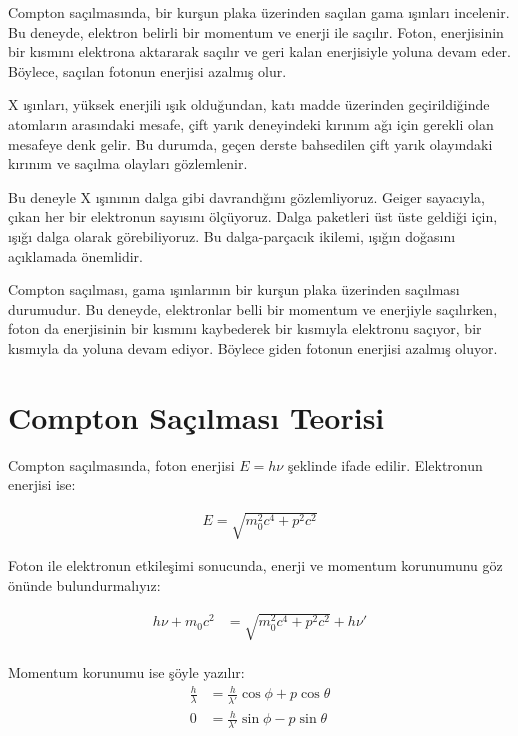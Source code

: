 \documentclass[11pt,letterpaper]{fenbil}
\begin{document}
Compton saçılmasında, bir kurşun plaka üzerinden saçılan gama ışınları incelenir. Bu deneyde, elektron belirli bir momentum ve enerji ile saçılır. Foton, enerjisinin bir kısmını elektrona aktararak saçılır ve geri kalan enerjisiyle yoluna devam eder. Böylece, saçılan fotonun enerjisi azalmış olur.

X ışınları, yüksek enerjili ışık olduğundan, katı madde üzerinden geçirildiğinde atomların arasındaki mesafe, çift yarık deneyindeki kırınım ağı için gerekli olan mesafeye denk gelir. Bu durumda, geçen derste bahsedilen çift yarık olayındaki kırınım ve saçılma olayları gözlemlenir.

Bu deneyle X ışınının dalga gibi davrandığını gözlemliyoruz. Geiger sayacıyla, çıkan her bir elektronun sayısını ölçüyoruz. Dalga paketleri üst üste geldiği için, ışığı dalga olarak görebiliyoruz. Bu dalga-parçacık ikilemi, ışığın doğasını açıklamada önemlidir.

\begin{tcolorbox}[title=\textbf{ÖNEMLİ: Compton Saçılması}]
Compton saçılması, gama ışınlarının bir kurşun plaka üzerinden saçılması durumudur. Bu deneyde, elektronlar belli bir momentum ve enerjiyle saçılırken, foton da enerjisinin bir kısmını kaybederek bir kısmıyla elektronu saçıyor, bir kısmıyla da yoluna devam ediyor. Böylece giden fotonun enerjisi azalmış oluyor.
\end{tcolorbox}

\section{Compton Saçılması Teorisi}

Compton saçılmasında, foton enerjisi $E = h\nu$ şeklinde ifade edilir. Elektronun enerjisi ise:

\begin{align}
E = \sqrt{m_0^2c^4 + p^2c^2}
\end{align}

Foton ile elektronun etkileşimi sonucunda, enerji ve momentum korunumunu göz önünde bulundurmalıyız:

\begin{align}
h\nu + m_0c^2 &= \sqrt{m_0^2c^4 + p^2c^2} + h\nu' \\
\end{align}

Momentum korunumu ise şöyle yazılır:
\begin{align}
\frac{h}{\lambda} &= \frac{h}{\lambda'}\cos\phi + p\cos\theta \\
0 &= \frac{h}{\lambda'}\sin\phi - p\sin\theta
\end{align}
\end{document}

